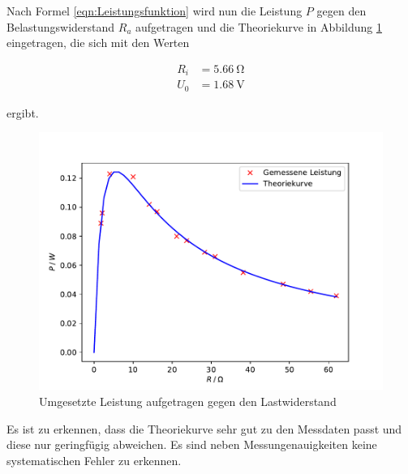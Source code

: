 Nach Formel \ref{eqn:Leistungsfunktion} wird nun die Leistung $P$ gegen den
Belastungswiderstand $R_a$ aufgetragen und die Theoriekurve in Abbildung 
\ref{fig:plot5} eingetragen, die sich mit den Werten

\begin{align*}
R_i &= \SI{5.66}{\ohm}\\
U_0 &= \SI{1.68}{\volt}
\end{align*}

ergibt.

\begin{figure}
  \centering
  \includegraphics[scale=0.75]{content/plot5.pdf}
  \caption{Umgesetzte Leistung aufgetragen gegen den Lastwiderstand}
  \label{fig:plot5}
\end{figure}

Es ist zu erkennen, dass die Theoriekurve sehr gut zu den Messdaten passt 
und diese nur geringfügig abweichen. Es sind neben Messungenauigkeiten
keine systematischen Fehler zu erkennen. 
